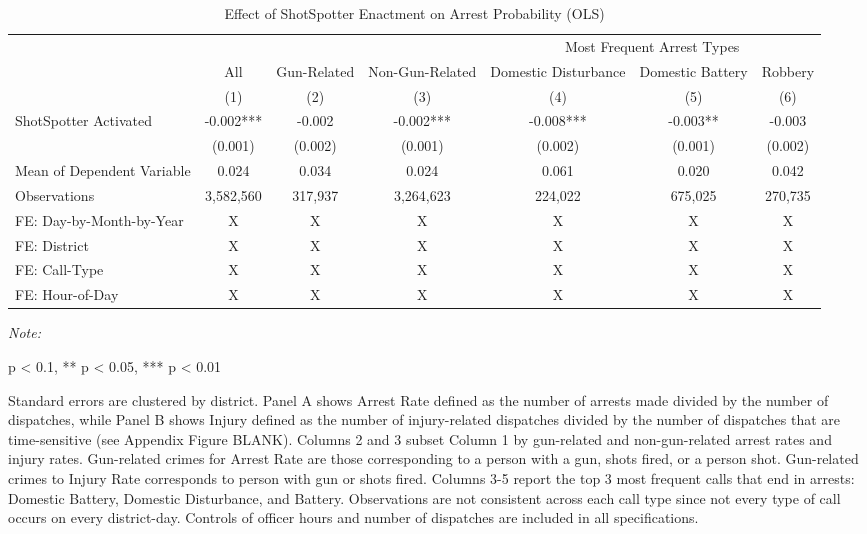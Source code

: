 \begin{table}[H]

\caption{\label{arrest_prob}Effect of ShotSpotter Enactment on Arrest Probability (OLS)}
\centering
\begin{threeparttable}
\fontsize{11}{13}\selectfont
\begin{tabular}[t]{lcccccc}
\toprule
\multicolumn{4}{c}{ } & \multicolumn{3}{c}{Most Frequent Arrest Types} \\
\cmidrule(l{3pt}r{3pt}){5-7}
\multicolumn{1}{c}{ } & \multicolumn{1}{c}{All} & \multicolumn{1}{c}{Gun-Related} & \multicolumn{1}{c}{Non-Gun-Related} & \multicolumn{1}{c}{Domestic Disturbance} & \multicolumn{1}{c}{Domestic Battery} & \multicolumn{1}{c}{Robbery} \\
\cmidrule(l{3pt}r{3pt}){2-2} \cmidrule(l{3pt}r{3pt}){3-3} \cmidrule(l{3pt}r{3pt}){4-4} \cmidrule(l{3pt}r{3pt}){5-5} \cmidrule(l{3pt}r{3pt}){6-6} \cmidrule(l{3pt}r{3pt}){7-7}
  & (1) & (2) & (3) & (4) & (5) & (6)\\
\midrule
ShotSpotter Activated & -0.002*** & -0.002 & -0.002*** & -0.008*** & -0.003** & -0.003\\
 & (0.001) & (0.002) & (0.001) & (0.002) & (0.001) & (0.002)\\
Mean of Dependent Variable & 0.024 & 0.034 & 0.024 & 0.061 & 0.020 & 0.042\\
Observations & 3,582,560 & 317,937 & 3,264,623 & 224,022 & 675,025 & 270,735\\
FE: Day-by-Month-by-Year & X & X & X & X & X & X\\
\addlinespace
FE: District & X & X & X & X & X & X\\
FE: Call-Type & X & X & X & X & X & X\\
FE: Hour-of-Day & X & X & X & X & X & X\\
\bottomrule
\end{tabular}
\begin{tablenotes}
\item \textit{Note: } 
\item * p < 0.1, ** p < 0.05, *** p < 0.01
\item Standard errors are clustered by district.                   Panel A shows Arrest Rate defined as the number of arrests made                  divided by the number of dispatches, while Panel B shows Injury defined as the                  number of injury-related dispatches divided by the number of dispatches that are time-sensitive (see Appendix Figure BLANK).                   Columns 2 and 3 subset Column 1 by gun-related and non-gun-related arrest rates and injury rates.                  Gun-related crimes for Arrest Rate are those corresponding to a person with a gun,                  shots fired, or a person shot. Gun-related crimes to Injury Rate corresponds to                  person with gun or shots fired.                  Columns 3-5 report the                   top 3 most frequent calls that end in arrests: Domestic Battery,                  Domestic Disturbance, and Battery. Observations are not consistent across each                  call type since not every type of call occurs on every district-day. Controls                  of officer hours and number of dispatches                  are included in all specifications.                   

\end{tablenotes}
\end{threeparttable}
\end{table}
